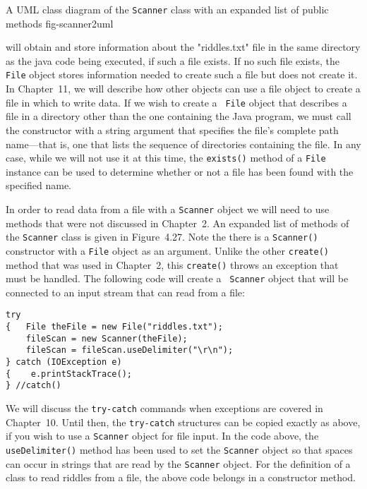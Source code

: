 {A UML class diagram of the {\tt Scanner} class with an
expanded list of public methods}
{fig-scanner2uml}

\noindent will obtain and store information about the "riddles.txt" file in
the same directory as the java code being executed, if such a file
exists.  If no such file exists, the {\tt File} object stores
information needed to create such a file but does not create it.  In
Chapter~11, we will describe how other objects can use a file object
to create a file in which to write data.  If we wish to create a {\tt
File} object that describes a file in a directory other than the one
containing the Java program, we must call the constructor with a
string argument that specifies the file's complete path name---that is,
one that lists the sequence of directories containing the file.  In
any case, while we will not use it at this time, the {\tt exists()}
method of a {\tt File} instance can be used to determine whether or
not a file has been found with the specified name.

In order to read data from a file with a {\tt Scanner} object we will
need to use methods that were not discussed in Chapter~2.  An expanded
list of methods of the {\tt Scanner} class is given in
Figure~4.27. Note the there is a {\tt Scanner()} constructor with a
{\tt File} object as an argument.  Unlike the other {\tt create()}
method that was used in Chapter~2, this {\tt create()} throws an
exception that must be handled.  The following code will create a {\tt
Scanner} object that will be connected to an input stream that can
read from a file:

\begin{jjjlisting}
\begin{lstlisting}
try
{   File theFile = new File("riddles.txt");
    fileScan = new Scanner(theFile);
    fileScan = fileScan.useDelimiter("\r\n");
} catch (IOException e)
{    e.printStackTrace();
} //catch()
\end{lstlisting}
\end{jjjlisting}

\noindent We will discuss the {\tt try-catch} commands when exceptions 
are covered in Chapter~10.  Until then, the {\tt try-catch} structures
can be copied exactly as above, if you wish to use a {\tt Scanner}
object for file input.  In the code above, the {\tt useDelimiter()}
method has been used to set the {\tt Scanner} object so that spaces
can occur in strings that are read by the {\tt Scanner} object. For
the definition of a class to read riddles from a file, the above code
belongs in a constructor method.


